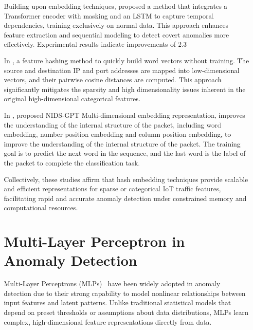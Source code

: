 \begin{ZhChapter}
    Building upon embedding techniques, \citeauthor{10946976} \cite{10946976} proposed a method that integrates a Transformer encoder with masking and an LSTM to capture temporal dependencies, training exclusively on normal data. This approach enhances feature extraction and sequential modeling to detect covert anomalies more effectively. Experimental results indicate improvements of 2.3%

    In \cite{argerich2016hash2vec}, \citeauthor{argerich2016hash2vec} a feature hashing method to quickly build word vectors without training. The source and destination IP and port addresses are mapped into low-dimensional vectors, and their pairwise cosine distances are computed. This approach significantly mitigates the sparsity and high dimensionality issues inherent in the original high-dimensional categorical features.

    In \cite{huang2024take}, \citeauthor{huang2024take} proposed  NIDS-GPT Multi-dimensional embedding representation, improves the understanding of the internal structure of the packet, including word embedding, number position embedding and column position embedding, to improve the understanding of the internal structure of the packet. The training goal is to predict the next word in the sequence, and the last word is the label of the packet to complete the classification task.


    Collectively, these studies affirm that hash embedding techniques provide scalable and efficient representations for sparse or categorical IoT traffic features, facilitating rapid and accurate anomaly detection under constrained memory and computational resources.



    \section{Multi-Layer Perceptron in Anomaly Detection}
    Multi-Layer Perceptrons (MLPs)~\cite{lecun2015deep} have been widely adopted in anomaly detection due to their strong capability to model nonlinear relationships between input features and latent patterns. Unlike traditional statistical models that depend on preset thresholds or assumptions about data distributions, MLPs learn complex, high-dimensional feature representations directly from data.


\end{ZhChapter}
